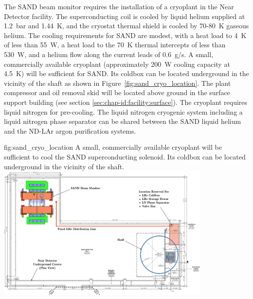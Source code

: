 The SAND beam monitor requires the installation of a cryoplant in the Near Detector facility. The superconducting coil is cooled by liquid helium supplied at 1.2~bar and 1.44~K, and the cryostat thermal shield is cooled by 70-80~K gaseous helium. The cooling requirements for SAND are modest, with a heat load to 4~K of less than 55~W, a heat load to the 70~K thermal intercepts of less than 530~W, and a helium flow along the current leads of 0.6~g/s. A small, commercially available cryoplant (approximately 200~W cooling capacity at 4.5~K) will be sufficient for SAND. Its coldbox can be located underground in the vicinity of the shaft as shown in Figure~\ref{fig:sand_cryo_location}. The plant compressor and oil removal skid will be located above ground in the surface support building (see section \ref{sec:chap-id:facility:surface}). The cryoplant requires liquid nitrogen for pre-cooling. The liquid nitrogen cryogenic system including a liquid nitrogen phase separator can be shared between the SAND liquid helium and the ND-LAr argon purification systems.

\begin{dunefigure}{fig:sand_cryo_location}
{A small, commercially available cryoplant will be sufficient to cool the SAND superconducting solenoid. Its coldbox can be located underground in the vicinity of the shaft.}
\includegraphics[width=0.8\textwidth]{graphics/i-and-i/sand_cryo_location}
\end{dunefigure}

